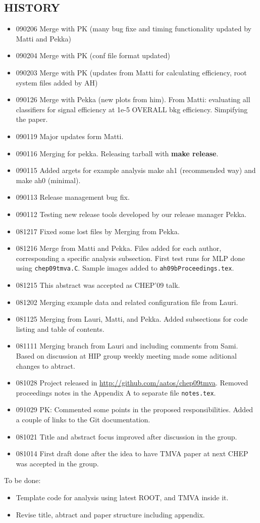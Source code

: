 \begin{appendix}
\section{HISTORY}
\begin{itemize}
\item 090206 Merge with PK (many bug fixe and timing functionality updated by Matti and Pekka)
\item 090204 Merge with PK (conf file format updated)
\item 090203 Merge with PK (updates from Matti for calculating efficiency, 
              root system files added by AH)
\item 090126 Merge with Pekka (new plots from him). 
             From Matti: evaluating all classifiers for signal efficiency 
             at 1e-5 OVERALL bkg efficiency. Simpifying the paper.
\item 090119 Major updates form Matti.
\item 090116 Merging for pekka. Releasing tarball with {\bf make release}.
\item 090115 Added argets for example analysis make ah1 (recommended way) and make ah0 (minimal).
\item 090113 Release management bug fix.
\item 090112 Testing new release tools developed by our release manager Pekka.
\item 081217 Fixed some lost files by Merging from Pekka.
\item 081216 Merge from Matti and Pekka. 
Files added for each author, corresponding a specific analysis subsection.
First test runs for MLP done using {\tt chep09tmva.C}. Sample images added to {\tt ah09bProceedings.tex}.
\item 081215 This abstract was accepted as CHEP'09 talk.
\item 081202 Merging example data and related configuration file from Lauri.
\item 081125 Merging from Lauri, Matti, and Pekka. 
Added subsections for code listing and table of contents.
\item 081111 Merging branch from Lauri and including comments from Sami. 
Based on discussion at HIP group weekly meeting made some aditional changes to abtract.
\item 081028 Project released in \url{http://github.com/aatos/chep09tmva}. Removed proceedings notes in the Appendix A to separate file {\tt notes.tex}.
\item 091029 PK: Commented some points in the proposed
  responsibilities. Added a couple of links to the Git documentation.
\item 081021 Title and abstract focus improved after discussion in the group. 
\item 081014 First draft done after the idea to have TMVA paper at next CHEP was accepted in the group.
\end{itemize}


To be done:
\begin{itemize}
\item Template code for  analysis using latest ROOT, and TMVA inside it.
\item Revise title, abtract and paper structure including appendix.
\end{itemize}

\end{appendix}
